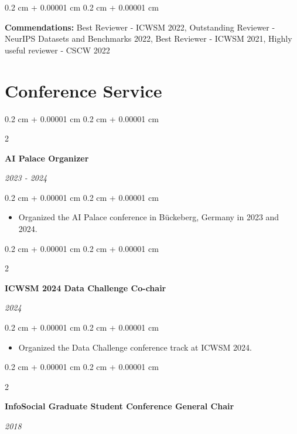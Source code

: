 \documentclass[10pt, letterpaper]{article}
\newenvironment{highlights}{
    \begin{itemize}[
        topsep=0.10 cm,
        parsep=0.10 cm,
        partopsep=0pt,
        itemsep=0pt,
        leftmargin=0.4 cm + 10pt
    ]
}{
    \end{itemize}
} %
\newenvironment{onecolentry}{
    \begin{adjustwidth}{
        0.2 cm + 0.00001 cm
    }{
        0.2 cm + 0.00001 cm
    }
}{
    \end{adjustwidth}
} %
\newenvironment{twocolentry}[2][]{
    \onecolentry
    \def\secondColumn{#2}
    \setcolumnwidth{\fill, 4.1 cm}
    \begin{paracol}{2}
}{
    \switchcolumn \raggedleft \secondColumn
    \end{paracol}
    \endonecolentry
} %
\begin{document}
        \begin{onecolentry}
            \textbf{Commendations:} Best Reviewer - ICWSM 2022, Outstanding Reviewer - NeurIPS Datasets and Benchmarks 2022, Best Reviewer - ICWSM 2021, Highly useful reviewer - CSCW 2022
        \end{onecolentry}


    
    \section{Conference Service}



        
        \begin{twocolentry}{
            
            
        \textit{2023 - 2024}}
            \textbf{AI Palace Organizer}
        \end{twocolentry}

        \vspace{0.10 cm}
        \begin{onecolentry}
            \begin{highlights}
                \item Organized the AI Palace conference in Bückeberg, Germany in 2023 and 2024.
            \end{highlights}
        \end{onecolentry}


        \vspace{0.2 cm}

        \begin{twocolentry}{
            
            
        \textit{2024}}
            \textbf{ICWSM 2024 Data Challenge Co-chair}
        \end{twocolentry}

        \vspace{0.10 cm}
        \begin{onecolentry}
            \begin{highlights}
                \item Organized the Data Challenge conference track at ICWSM 2024.
            \end{highlights}
        \end{onecolentry}


        \vspace{0.2 cm}

        \begin{twocolentry}{
            
            
        \textit{2018}}
            \textbf{InfoSocial Graduate Student Conference General Chair}
        \end{twocolentry}
\end{document}
